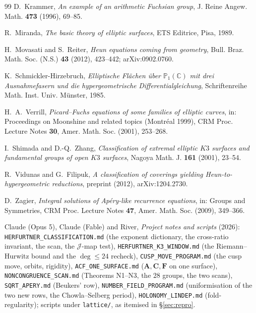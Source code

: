 \documentclass[11pt,reqno]{amsart}
\theoremstyle{plain}
\theoremstyle{definition}
\theoremstyle{remark}
\theoremstyle{plain}
\newcommand{\PP}{\mathbb{P}}
\begin{document}
\begin{thebibliography}{99}
D.~Krammer,
\emph{An example of an arithmetic Fuchsian group},
J. Reine Angew. Math. \textbf{473} (1996), 69--85.

R.~Miranda,
\emph{The basic theory of elliptic surfaces},
ETS Editrice, Pisa, 1989.

H.~Movasati and S.~Reiter,
\emph{Heun equations coming from geometry},
Bull. Braz. Math. Soc. (N.S.) \textbf{43} (2012), 423--442; arXiv:0902.0760.

K.~Schmickler-Hirzebruch,
\emph{Elliptische Fl\"achen \"uber $\PP_1(\mathbb C)$ mit drei Ausnahmefasern
und die hypergeometrische Differentialgleichung},
Schriftenreihe Math. Inst. Univ. M\"unster, 1985.

H.~A.~Verrill,
\emph{Picard--Fuchs equations of some families of elliptic curves},
in: Proceedings on Moonshine and related topics (Montr\'eal 1999), CRM Proc.
Lecture Notes \textbf{30}, Amer. Math. Soc. (2001), 253--268.

I.~Shimada and D.-Q.~Zhang,
\emph{Classification of extremal elliptic $K3$ surfaces and fundamental groups of
open $K3$ surfaces},
Nagoya Math. J. \textbf{161} (2001), 23--54.

R.~Vidunas and G.~Filipuk,
\emph{A classification of coverings yielding Heun-to-hypergeometric reductions},
preprint (2012), arXiv:1204.2730.

D.~Zagier,
\emph{Integral solutions of Ap\'ery-like recurrence equations},
in: Groups and Symmetries, CRM Proc. Lecture Notes \textbf{47}, Amer. Math. Soc.
(2009), 349--366.

Claude (Opus 5), Claude (Fable) and River,
\emph{Project notes and scripts} (2026):
\texttt{HERFURTNER\_CLASSIFICATION.md} (the exponent dictionary, the cross-ratio
invariant, the scan, the $\mathcal J$-map test),
\texttt{HERFURTNER\_K3\_WINDOW.md} (the Riemann--Hurwitz bound and the
$\deg\le24$ recheck),
\texttt{CUSP\_MOVE\_PROGRAM.md} (the cusp move, orbits, rigidity),
\texttt{ACF\_ONE\_SURFACE.md} ($\mathbf A,\mathbf C,\mathbf F$ on one surface),
\texttt{NONCONGRUENCE\_SCAN.md} (Theorems N1--N3, the $28$ groups, the two
scans),
\texttt{SQRT\_APERY.md} (Beukers' row),
\texttt{NUMBER\_FIELD\_PROGRAM.md} (uniformisation of the two new rows, the
Chowla--Selberg period),
\texttt{HOLONOMY\_LINDEP.md} (fold-regularity);
scripts under \texttt{lattice/}, as itemised in \S\ref{sec:repro}.

\end{thebibliography}
\end{document}
